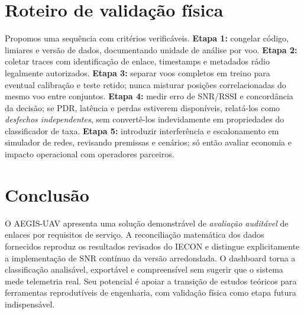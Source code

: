\documentclass[10pt,a4paper,twocolumn]{article}
\begin{document}
\section{Roteiro de validação física}
Propomos uma sequência com critérios verificáveis. \textbf{Etapa 1:} congelar código, limiares e versão de dados, documentando unidade de análise por voo. \textbf{Etapa 2:} coletar traces com identificação de enlace, timestamps e metadados rádio legalmente autorizados. \textbf{Etapa 3:} separar voos completos em treino para eventual calibração e teste retido; nunca misturar posições correlacionadas do mesmo voo entre conjuntos. \textbf{Etapa 4:} medir erro de SNR/RSSI e concordância da decisão; se PDR, latência e perdas estiverem disponíveis, relatá-los como \emph{desfechos independentes}, sem convertê-los indevidamente em propriedades do classificador de taxa. \textbf{Etapa 5:} introduzir interferência e escalonamento em simulador de redes, revisando premissas e cenários; só então avaliar economia e impacto operacional com operadores parceiros.

\section{Conclusão}
O AEGIS-UAV apresenta uma solução demonstrável de \emph{avaliação auditável} de enlaces por requisitos de serviço. A reconciliação matemática dos dados fornecidos reproduz os resultados revisados do IECON e distingue explicitamente a implementação de SNR contínuo da versão arredondada. O dashboard torna a classificação analisável, exportável e compreensível sem sugerir que o sistema mede telemetria real. Seu potencial é apoiar a transição de estudos teóricos para ferramentas reprodutíveis de engenharia, com validação física como etapa futura indispensável.
\end{document}
